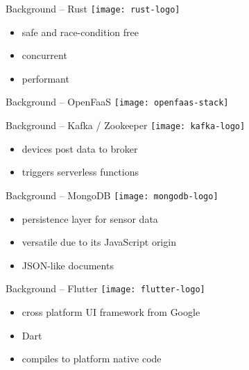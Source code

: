 \documentclass[aspectratio=169]{beamer}
\begin{document}
  \begin{frame}{Background -- Rust}
    \texttt{[image: rust-logo]}

    \vspace*{1.5em}

    \begin{itemize}
      \item safe and race-condition free
      \item concurrent
      \item performant
    \end{itemize}
  \end{frame}

  \begin{frame}{Background -- OpenFaaS}
    \texttt{[image: openfaas-stack]}
  \end{frame}

  \begin{frame}{Background -- Kafka / Zookeeper}
    \texttt{[image: kafka-logo]}

    \vspace*{1.5em}

    \begin{itemize}
      \item devices post data to broker
      \item triggers serverless functions
    \end{itemize}
  \end{frame}

  \begin{frame}{Background -- MongoDB}
    \texttt{[image: mongodb-logo]}

    \vspace*{1.5em}

    \begin{itemize}
      \item persistence layer for sensor data
      \item versatile due to its JavaScript origin
      \item JSON-like documents
    \end{itemize}
  \end{frame}

  \begin{frame}{Background -- Flutter}
    \texttt{[image: flutter-logo]}

    \vspace*{2em}

    \begin{itemize}
      \item cross platform UI framework from Google
      \item Dart
      \item compiles to platform native code
    \end{itemize}
  \end{frame}
\end{document}
